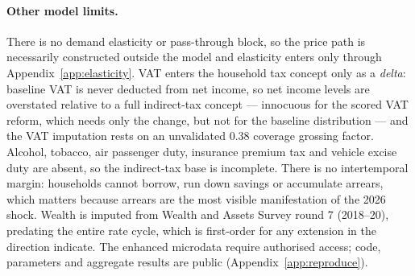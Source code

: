 \paragraph{Other model limits.} There is no demand elasticity or pass-through block, so the price path is necessarily constructed outside the model and elasticity enters only through Appendix~\ref{app:elasticity}. VAT enters the household tax concept only as a \emph{delta}: baseline VAT is never deducted from net income, so net income levels are overstated relative to a full indirect-tax concept --- innocuous for the scored VAT reform, which needs only the change, but not for the baseline distribution --- and the VAT imputation rests on an unvalidated 0.38 coverage grossing factor. Alcohol, tobacco, air passenger duty, insurance premium tax and vehicle excise duty are absent, so the indirect-tax base is incomplete. There is no intertemporal margin: households cannot borrow, run down savings or accumulate arrears, which matters because arrears are the most visible manifestation of the 2026 shock. Wealth is imputed from Wealth and Assets Survey round 7 (2018--20), predating the entire rate cycle, which is first-order for any extension in the direction \citet{pallotti2024} indicate. The enhanced microdata require authorised access; code, parameters and aggregate results are public (Appendix~\ref{app:reproduce}).
